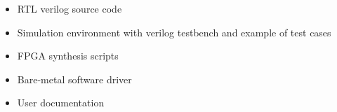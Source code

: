 \begin{itemize}                                                                    
  \itemsep-0.5em                                                                   
\item RTL verilog source code                                                      
\item Simulation environment with verilog testbench and example of test cases      
\item FPGA synthesis scripts                                                       
\item Bare-metal software driver                                                   
\item User documentation                                                           
\end{itemize}   
